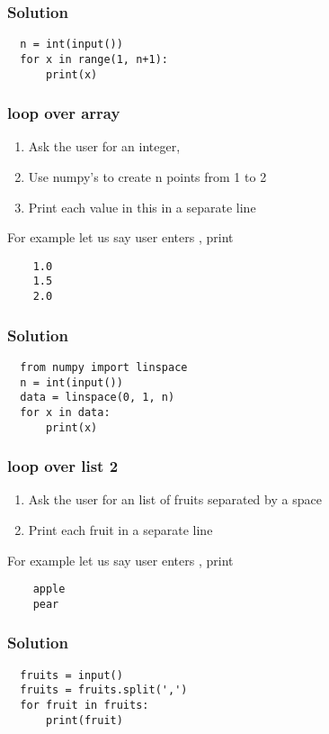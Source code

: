 \documentclass[14pt,compress]{beamer}
\begin{document}
\begin{frame}
\frametitle{Solution}
\begin{lstlisting}
  n = int(input())
  for x in range(1, n+1):
      print(x)
\end{lstlisting}
\end{frame}


\begin{frame}
  \frametitle{ loop over array}
  \begin{enumerate}
  \item Ask the user for an integer, 
  \item Use numpy's  to create n points from 1 to 2
  \item Print each value in this in a separate line
  \end{enumerate}
  For example let us say user enters , print
  \begin{lstlisting}
    1.0
    1.5
    2.0
  \end{lstlisting}
\end{frame}

\begin{frame}
\frametitle{Solution}
\begin{lstlisting}
  from numpy import linspace
  n = int(input())
  data = linspace(0, 1, n)
  for x in data:
      print(x)
\end{lstlisting}
\end{frame}


\begin{frame}
  \frametitle{ loop over list 2}
  \begin{enumerate}
  \item Ask the user for an list of fruits separated by a space
  \item Print each fruit in a separate line
  \end{enumerate}
  For example let us say user enters , print
  \begin{lstlisting}
    apple
    pear
  \end{lstlisting}
\end{frame}

\begin{frame}
\frametitle{Solution}
\begin{lstlisting}
  fruits = input()
  fruits = fruits.split(',')
  for fruit in fruits:
      print(fruit)
\end{lstlisting}
\end{frame}
\end{document}
